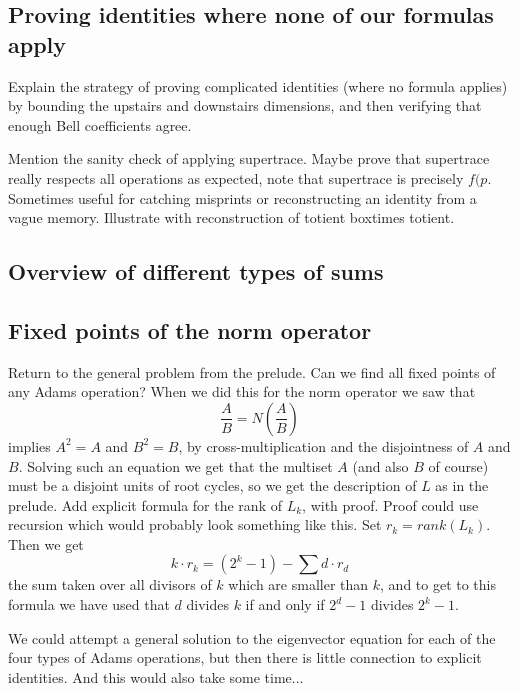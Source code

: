 \subsection{Proving identities where none of our formulas apply}

Explain the strategy of proving complicated identities (where no formula applies) by bounding the upstairs and downstairs dimensions, and then verifying that enough Bell coefficients agree.

Mention the sanity check of applying supertrace. Maybe prove that supertrace really respects all operations as expected, note that supertrace is precisely $f(p$. Sometimes useful for catching misprints or reconstructing an identity from a vague memory. Illustrate with reconstruction of totient boxtimes totient.


\subsection{Overview of different types of sums}



\subsection{Fixed points of the norm operator}

Return to the general problem from the prelude. Can we find all fixed points of any Adams operation? When we did this for the norm operator we saw that 
$$ \frac{A}{B} = N(\frac{A}{B})   $$
implies $A^2 = A$ and $B^2 = B$, by cross-multiplication and the disjointness of $A$ and $B$. Solving such an equation we get that the multiset $A$ (and also $B$ of course) must be a disjoint units of root cycles, so we get the description of $L$ as in the prelude. Add explicit formula for the rank of $L_k$, with proof. Proof could use recursion which would probably look something like this. Set $r_k = rank(L_k)$. Then we get
$$ k \cdot r_k = (2^k-1) - \sum d \cdot r_d    $$
the sum taken over all divisors of $k$ which are smaller than $k$, and to get to this formula we have used that $d$ divides $k$ if and only if $2^d-1$ divides $2^k-1$.


We could attempt a general solution to the eigenvector equation for each of the four types of Adams operations, but then there is little connection to explicit identities. And this would also take some time...


